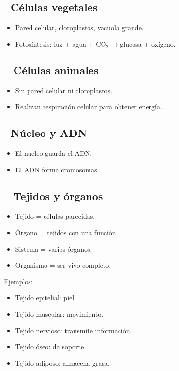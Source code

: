 \documentclass[a4paper,12pt]{article}
\begin{document}
\subsection*{🌱 Células vegetales}
\begin{itemize}
    \item Pared celular, cloroplastos, vacuola grande.
    \item Fotosíntesis: luz + agua + CO$_2$ → glucosa + oxígeno.
\end{itemize}

\subsection*{🧍‍♀️ Células animales}
\begin{itemize}
    \item Sin pared celular ni cloroplastos.
    \item Realizan respiración celular para obtener energía.
\end{itemize}

\subsection*{🧬 Núcleo y ADN}
\begin{itemize}
    \item El núcleo guarda el ADN.
    \item El ADN forma cromosomas.
\end{itemize}

\subsection*{🧍‍♂️ Tejidos y órganos}
\begin{itemize}
    \item Tejido = células parecidas.
    \item Órgano = tejidos con una función.
    \item Sistema = varios órganos.
    \item Organismo = ser vivo completo.
\end{itemize}

Ejemplos:
\begin{itemize}
    \item Tejido epitelial: piel.
    \item Tejido muscular: movimiento.
    \item Tejido nervioso: transmite información.
    \item Tejido óseo: da soporte.
    \item Tejido adiposo: almacena grasa.
\end{itemize}
\end{document}
